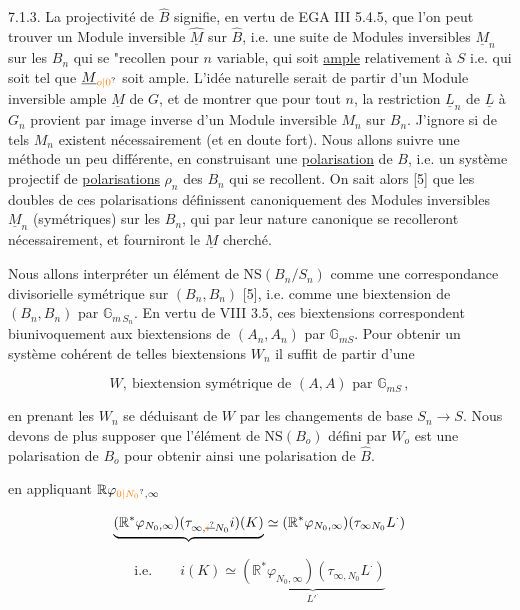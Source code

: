 7.1.3. La projectivité de $\hat B$ signifie, en vertu de EGA III 5.4.5, que l'on peut trouver un Module inversible $\underline{\hat M}$ sur $\hat B$, i.e. une suite de Modules inversibles $\underline M_n$ sur les $B_n$ qui se "recollen pour $n$ variable, qui soit \uline{ample} relativement à $S$ i.e. qui soit tel que $\underline M_{\unsure{o|0}}$ soit ample. L'idée naturelle serait de partir d'un Module inversible ample $\underline M$ de $G$, et de montrer que pour tout $n$, la restriction $\underline L_n$ de $\underline L$ à $G_n$ provient par image inverse d'un Module inversible $M_n$ sur $B_n$. J'ignore si de tels $M_n$ existent nécessairement (et en doute fort). Nous allons suivre une méthode un peu différente, en construisant une \uline{polarisation} de $B$, i.e. un système projectif de \uline{polarisations} $\rho_n$ des $B_n$ qui se recollent. On sait alors [5] que les doubles de ces polarisations définissent canoniquement des Modules inversibles $\underline M_n$ (symétriques) sur les $B_n$, qui par leur nature canonique se recolleront nécessairement, et fourniront le $\underline M$ cherché.

Nous allons interpréter un élément de $\mathrm{NS}(B_n/S_n)$ comme une correspondance divisorielle symétrique sur $(B_n,B_n)$ [5], i.e. comme une biextension de $(B_n,B_n)$ par $\mathbb G_{m\,S_n}$. En vertu de VIII 3.5, ces biextensions correspondent biunivoquement aux biextensions de $(A_n,A_n)$ par $\mathbb G_{mS}$. Pour obtenir un système cohérent de telles biextensions $W_n$ il suffit de partir d'une

\[
W,\ \text{biextension symétrique de }(A,A)\text{ par }\mathbb G_{mS}\,,\tag*{(7.1.4)}
\]

en prenant les $W_n$ se déduisant de $W$ par les changements de base $S_n\longrightarrow S$. Nous devons de plus supposer que l'élément de $\mathrm{NS}(B_o)$ défini par $W_o$ est une polarisation de $B_o$ pour obtenir ainsi une polarisation de $\hat B$.

en appliquant $\mathbb R\varphi_{\unsure{0|N_0},\infty}$

\[
\underbrace{(\mathbb R^*\varphi_{N_0,\infty})(\tau_{\infty,\deleted{\unsure{i}}N_0}i)(K)}
\simeq(\mathbb R^{*}\varphi_{N_0,\infty})(\tau_{\infty N_0}L^\cdot)
\]

\[
\text{i.e.}\qquad i(K)\simeq
\underbrace{(\mathbb R^*\varphi_{N_0,\infty})(\tau_{\infty,N_0}L^\cdot)}_{L'^\cdot}
\]

